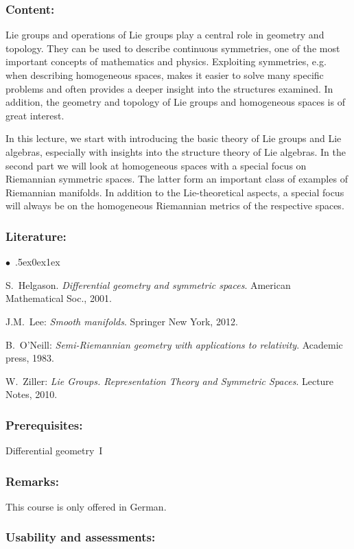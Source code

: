 \documentclass[a4paper,10pt]{article}
\renewenvironment{itemize}{\begin{list}{$\bullet$\ }{\itemsep.5ex\setlength{\topsep}{0.5\itemsep}\parsep0ex\labelsep1ex\settowidth{\labelwidth}{$\bullet$\ }\setlength{\leftmargin}{\labelwidth}\addtolength{\leftmargin}{3ex}\addtolength{\leftmargin}{\labelsep}}}{\end{list}}
\begin{document}
\subsubsection*{\large
    Content:
}
Lie groups and operations of Lie groups play a central role in geometry and topology. They can be used to describe continuous symmetries, one of the most important concepts of mathematics and physics. Exploiting symmetries, e.g. when describing homogeneous spaces, makes it easier to solve many specific problems and often provides a deeper insight into the structures examined. In addition, the geometry and topology of Lie groups and homogeneous spaces is of great interest.

 In this lecture, we start with introducing the basic theory of Lie groups and Lie algebras, especially with insights into the structure theory of Lie algebras. In the second part we will look at homogeneous spaces with a special focus on Riemannian symmetric spaces. The latter form an important class of examples of Riemannian manifolds. In addition to the Lie-theoretical aspects, a special focus will always be on the homogeneous Riemannian metrics of the respective spaces.
\subsubsection*{\large
    Literature:
}
\begin{itemize}
\item
S.~Helgason. \emph{Differential geometry and symmetric spaces}. American Mathematical Soc., 2001.
\item
J.M.~Lee: \emph{Smooth manifolds}. Springer New York, 2012.
\item
B.~O'Neill: \emph{Semi-Riemannian geometry with applications to relativity}. Academic press, 1983.
\item
W.~Ziller: \emph{Lie Groups. Representation Theory and Symmetric Spaces}. Lecture Notes, 2010.
\end{itemize}

\subsubsection*{\large
    Prerequisites:
}
Differential geometry~I
\subsubsection*{\large
    Remarks:
}
This course is only offered in German.
\cleardoublepage
\subsubsection*{\large
    Usability and assessments:
}
\end{document}
